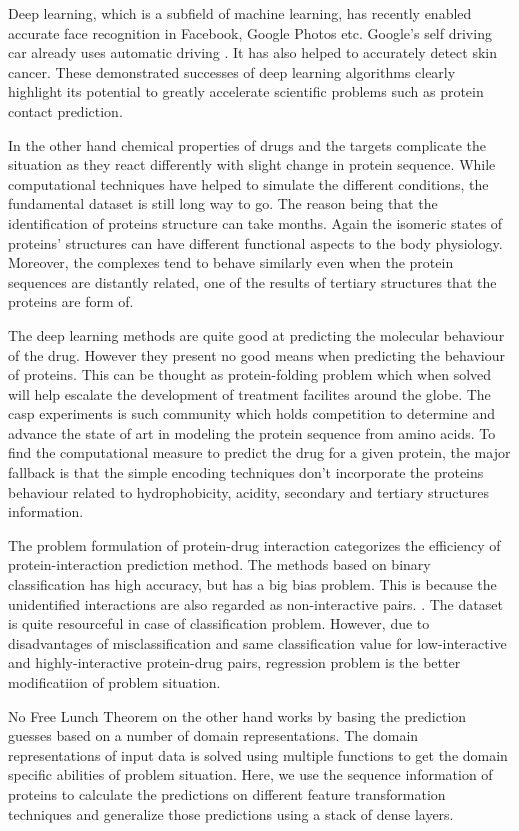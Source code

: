 Deep learning, which is a subfield of machine learning, has recently enabled accurate face recognition in Facebook, Google Photos etc. Google’s self driving car already uses automatic driving \citep{Becker2008}. It has also helped to accurately detect skin cancer. These demonstrated successes of deep learning algorithms clearly highlight its potential to greatly accelerate scientific problems such as protein contact prediction. 

In the other hand chemical properties of drugs and the targets complicate the situation as they react differently with slight change in protein sequence. While computational techniques have helped to simulate the different conditions, the fundamental dataset is still long way to go. The reason being that the identification of proteins structure can take months. Again the isomeric states of proteins' structures can have different functional aspects to the body physiology. Moreover, the complexes tend to behave similarly even when the protein sequences are distantly related, one of the results of tertiary structures that the proteins are form of. \citep{Choudhuri2014}

The deep learning methods are quite good at predicting the molecular behaviour of the drug. However they present no good means when predicting the behaviour of proteins. This can be thought as protein-folding problem which when solved will help escalate the development of treatment facilites around the globe. The \acrfull{casp} experiments is such community which holds competition to determine and advance the state of art in modeling the protein sequence from amino acids.\citep{Gooch2011} To find the computational measure to predict the drug for a given protein, the major fallback is that the simple encoding techniques don’t incorporate the proteins behaviour related to hydrophobicity, acidity, secondary and tertiary structures information.\citep{Wong2018}

The problem formulation of protein-drug interaction categorizes the efficiency of protein-interaction prediction method. The methods based on binary classification has high accuracy, but has a big bias problem. This is because the unidentified interactions are also regarded as non-interactive pairs. \citep{Mahato2016,Tang2013}. The dataset is quite resourceful in case of classification problem. However, due to disadvantages of misclassification and same classification value for low-interactive and highly-interactive protein-drug pairs, regression problem is the better modificatiion of problem situation. \citep{Tang2013}

No Free Lunch Theorem \citep{Wolpert2005} on the other hand works by basing the prediction guesses based on a number of domain representations. The domain representations of input data is solved using multiple functions to get the domain specific abilities of problem situation. Here, we use the sequence information of proteins to calculate the predictions on different feature transformation techniques and generalize those predictions using a stack of dense layers.
